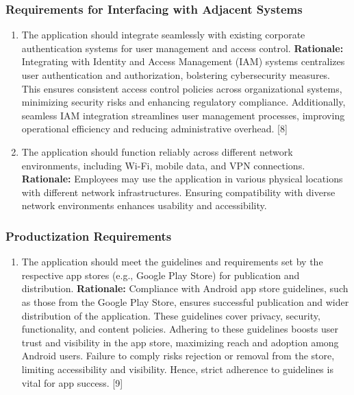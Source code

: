 \documentclass[]{article}
\begin{document}
\subsubsection{Requirements for Interfacing with Adjacent Systems}
\label{ssub:requirements_for_interfacing_with_adjacent_systems}
\begin{enumerate}[{OE-IA}1. ]
	\item The application should integrate seamlessly with existing corporate authentication systems for user management and access control. \newline
	      \textbf{Rationale:} Integrating with Identity and Access Management (IAM) systems centralizes user authentication and authorization, bolstering cybersecurity measures. This ensures consistent access control policies across organizational systems, minimizing security risks and enhancing regulatory compliance. Additionally, seamless IAM integration streamlines user management processes, improving operational efficiency and reducing administrative overhead. [8]
	\item The application should function reliably across different network environments, including Wi-Fi, mobile data, and VPN connections. \newline
	      \textbf{Rationale:} Employees may use the application in various physical locations with different network infrastructures. Ensuring compatibility with diverse network environments enhances usability and accessibility.
\end{enumerate}

\subsubsection{Productization Requirements}
\label{ssub:productization_requirements}
\begin{enumerate}[{OE-P}1. ]
	\item The application should meet the guidelines and requirements set by the respective app stores (e.g., Google Play Store) for publication and distribution. \newline
	      \textbf{Rationale:} Compliance with Android app store guidelines, such as those from the Google Play Store, ensures successful publication and wider distribution of the application. These guidelines cover privacy, security, functionality, and content policies. Adhering to these guidelines boosts user trust and visibility in the app store, maximizing reach and adoption among Android users. Failure to comply risks rejection or removal from the store, limiting accessibility and visibility. Hence, strict adherence to guidelines is vital for app success. [9]
\end{enumerate}
\end{document}
